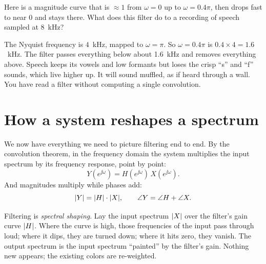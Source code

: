 \begin{walkbox}
Here is a magnitude curve that is $\approx 1$ from $\omega=0$ up to $\omega=0.4\pi$,
then drops fast to near $0$ and stays there. What does this filter do to a
recording of speech sampled at 8~kHz?

The Nyquist frequency is $4$~kHz, mapped to $\omega=\pi$. So $\omega=0.4\pi$ is
$0.4\times 4 = 1.6$~kHz. The filter passes everything below about 1.6~kHz and
removes everything above. Speech keeps its vowels and low formants but loses the
crisp ``s'' and ``f'' sounds, which live higher up. It will sound muffled, as if
heard through a wall. You have read a filter without computing a single
convolution.
\end{walkbox}

\section{How a system reshapes a spectrum}
\label{ch14:reshape}

We now have everything we need to picture filtering end to end. By the
convolution theorem, in the frequency domain the system multiplies the
input spectrum by its frequency response, point by point:
\begin{equation}
  Y(e^{\jj\omega}) = H(e^{\jj\omega})\,X(e^{\jj\omega}).
  \label{ch14:multiply}
\end{equation}
And magnitudes multiply while phases add:
\[
  \lvert Y\rvert = \lvert H\rvert\cdot\lvert X\rvert, \qquad \angle Y = \angle H + \angle X.
\]

\begin{happeningbox}
Filtering is \emph{spectral shaping}. Lay the input spectrum $\lvert X\rvert$ over the
filter's gain curve $\lvert H\rvert$. Where the curve is high, those frequencies of the
input pass through loud; where it dips, they are turned down; where it hits zero,
they vanish. The output spectrum is the input spectrum ``painted'' by the
filter's gain. Nothing new appears; the existing colors are re-weighted.
\end{happeningbox}

